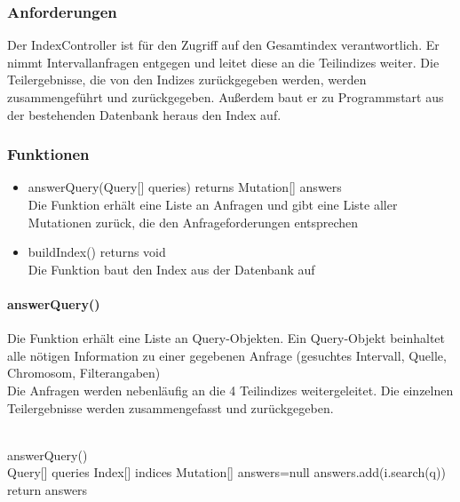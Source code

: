 \subsubsection{Anforderungen}
Der IndexController ist für den Zugriff auf den Gesamtindex verantwortlich. Er nimmt Intervallanfragen entgegen und leitet diese an die Teilindizes weiter.
Die Teilergebnisse, die von den Indizes zurückgegeben werden, werden zusammengeführt und zurückgegeben.
Außerdem baut er zu Programmstart aus der bestehenden Datenbank heraus den Index auf.
\subsubsection{Funktionen}
\begin{itemize}
\item answerQuery(Query[] queries) returns Mutation[] answers\\
Die Funktion erhält eine Liste an Anfragen und gibt eine Liste aller Mutationen zurück, die den Anfrageforderungen entsprechen
\item buildIndex() returns void\\
Die Funktion baut den Index aus der Datenbank auf
\end{itemize}
\paragraph{answerQuery()}
Die Funktion erhält eine Liste an Query-Objekten. Ein Query-Objekt beinhaltet alle nötigen Information zu einer gegebenen Anfrage (gesuchtes Intervall, Quelle, Chromosom, Filterangaben)\\
Die Anfragen werden nebenläufig an die 4 Teilindizes weitergeleitet. Die einzelnen Teilergebnisse werden zusammengefasst und zurückgegeben.\\
\\
\begin{algorithm}
answerQuery()\\
Query[] queries\;
Index[] indices\;
Mutation[] answers=null\;
{
{answers.add(i.search(q))\;}
}
return answers\;
\end{algorithm}


